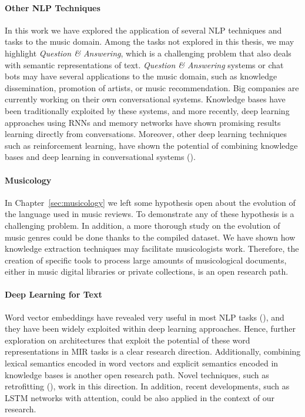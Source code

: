 \paragraph{Other NLP Techniques} In this work we have explored the application of several NLP techniques and tasks to the music domain. Among the tasks not explored in this thesis, we may highlight \textit{Question \& Answering}, which is a challenging problem that also deals with semantic representations of text. \textit{Question \& Answering} systems or chat bots may have several applications to the music domain, such as knowledge dissemination, promotion of artists, or music recommendation. Big companies are currently working on their own conversational systems. Knowledge bases have been traditionally exploited by these systems, and more recently, deep learning approaches using RNNs and memory networks have shown promising results learning directly from conversations. Moreover, other deep learning techniques such as reinforcement learning, have shown the potential of combining knowledge bases and deep learning in conversational systems (\cite{andreas2016learning}).

\paragraph{Musicology}
In Chapter~\ref{sec:musicology} we left some hypothesis open about the evolution of the language used in music reviews. To demonstrate any of these hypothesis is a challenging problem. In addition, a more thorough study on the evolution of music genres could be done thanks to the compiled dataset. We have shown how knowledge extraction techniques may facilitate musicologists work. Therefore, the creation of specific tools to process large amounts of musicological documents, either in music digital libraries or private collections, is an open research path.

\paragraph{Deep Learning for Text} Word vector embeddings have revealed very useful in most NLP tasks (\cite{Collobert2011}), and they have been widely exploited within deep learning approaches. Hence, further exploration on architectures that exploit the potential of these word representations in MIR tasks is a clear research direction. Additionally, combining lexical semantics encoded in word vectors and explicit semantics encoded in knowledge bases is another open research path. Novel techniques, such as retrofitting (\cite{faruqui2014retrofitting}), work in this direction. In addition, recent developments, such as LSTM networks with attention, could be also applied in the context of our research.

